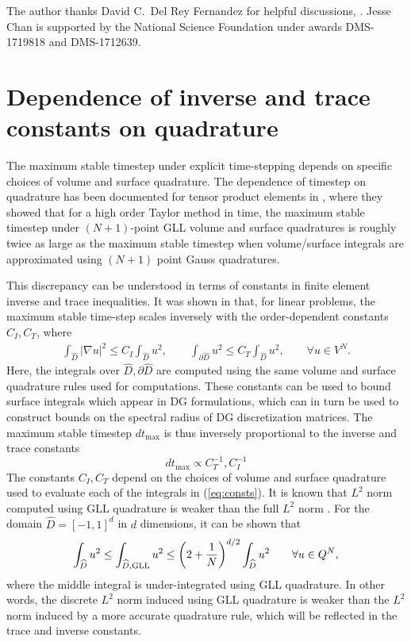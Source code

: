 \documentclass{svjour3}                     %
\renewcommand{\hat}{\widehat}
\newcommand{\LRp}[1]{\left( #1 \right)}
\newcommand{\LRb}[1]{\left| #1 \right|}
\newcommand{\Grad} {\ensuremath{\nabla}}
\newcommand{\rnote}[1]{{\color{red}{#1}}}
\begin{document}
The author thanks David C.\ Del Rey Fernandez for helpful discussions, \rnote{as well as the two anonymous reviewers whose comments significantly improved the readabilty of this manuscript}.  Jesse Chan is supported by the National Science Foundation under awards DMS-1719818 and DMS-1712639.  

\appendix
\section{Dependence of inverse and trace constants on quadrature}
\label{sec:consts}

The maximum stable timestep under explicit time-stepping depends on specific choices of volume and surface quadrature.  The dependence of timestep on quadrature has been documented for tensor product elements in \cite{gassner2011comparison}, where they showed that for a high order Taylor method in time, the maximum stable timestep under  $(N+1)$-point GLL volume and surface quadratures is roughly twice as large as the maximum stable timestep when volume/surface integrals are approximated using $(N+1)$ point Gauss quadratures.  

This discrepancy can be understood in terms of constants in finite element inverse and trace inequalities.  It was shown in \cite{chan2015gpu, chan2018multi} that, for linear problems, the maximum stable time-step scales inversely with the order-dependent constants $C_I, C_T$, where
\begin{align}
\int_{\hat{D}} \LRb{\Grad u}^2 \leq C_I \int_{\hat{D}} u^2, \qquad \int_{\partial \hat{D}} u^2 \leq C_T  \int_{\hat{D}} u^2, \qquad \forall u \in V^N \label{eq:consts}.
\end{align}
Here, the integrals over $\hat{D}, \partial \hat{D}$ are computed using the same volume and surface quadrature rules used for computations.  These constants can be used to bound surface integrals which appear in DG formulations, which can in turn be used to construct bounds on the spectral radius of DG discretization matrices.  The maximum stable timestep $dt_{\max}$ is thus inversely proportional to the inverse and trace constants
\[
dt_{\max} \propto C_T^{-1}, C_I^{-1}
\]
The constants $C_I, C_T$ depend on the choices of volume and surface quadrature used to evaluate each of the integrals in (\ref{eq:consts}).  It is known that $L^2$ norm computed using GLL quadrature is weaker than the full $L^2$ norm \cite{quarteroni1994introduction,canuto2007spectral}.  For the domain $\hat{D} = [-1,1]^d$ in $d$ dimensions, it can be shown that
\begin{equation}
\int_{\hat{D}} u^2 \leq \int_{\hat{D}, {\rm GLL}} u^2 \leq \LRp{2+\frac{1}{N}}^{d/2}\int_{\hat{D}} u^2 \qquad \forall u \in Q^{N},%
\label{eq:gllineq}
\end{equation}
where the middle integral is under-integrated using GLL quadrature.  In other words, the discrete $L^2$ norm induced using GLL quadrature is weaker than the $L^2$ norm induced by a more accurate quadrature rule, which will be reflected in the trace and inverse constants.  
\end{document}

